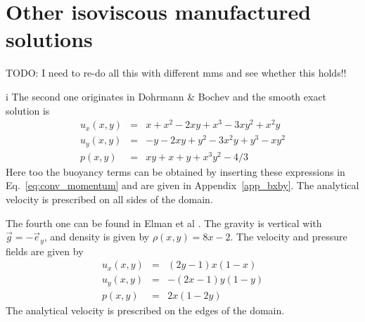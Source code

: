 \documentclass[a4paper]{article}
\begin{document}
\section{Other isoviscous manufactured solutions}

{\color{red} TODO: I need to re-do all this with different mms and see whether this holds!!}

i%
The second one originates in Dohrmann \& Bochev \cite{dobo04} and the smooth exact solution is
\begin{eqnarray}
u_x(x,y) &=& x+x^2 - 2xy+x^3 - 3xy^2 + x^2y \\
u_y(x,y) &=& -y-2xy+y^2 -3x^2y + y^3 - xy^2 \\
p(x,y) &=& xy+x+y+x^3y^2 - 4/3
\end{eqnarray}
Here too the buoyancy terms can be obtained by inserting these expressions
in Eq.~\ref{eq:conv_momentum}
and are given in Appendix~\ref{app_bxby}. The analytical velocity
is prescribed on all sides of the domain.


The fourth one can be found in Elman et al \cite{elsw}.
The gravity is vertical with $\vec{g}=-\vec{e}_y$, and 
density is given by $\rho(x,y)=8x-2$. The velocity and pressure fields are given by
\begin{eqnarray}
u_x(x,y) &=&  (2y-1)x(1-x) \\
u_y(x,y) &=& - (2x-1)y(1-y) \\
p(x,y) &=& 2x(1 - 2y)
\end{eqnarray}
The analytical velocity is prescribed on the edges of the domain. 
\end{document}
